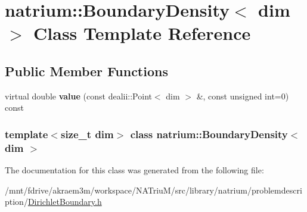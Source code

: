 \hypertarget{classnatrium_1_1BoundaryDensity}{
\section{natrium::BoundaryDensity$<$ dim $>$ Class Template Reference}
\label{classnatrium_1_1BoundaryDensity}
}
\subsection*{Public Member Functions}
\begin{DoxyCompactItemize}
\item 
\hypertarget{classnatrium_1_1BoundaryDensity_af8fcef848578f2e75d6aad467b38244f}{
virtual double {\bfseries value} (const dealii::Point$<$ dim $>$ \&, const unsigned int=0) const }
\label{classnatrium_1_1BoundaryDensity_af8fcef848578f2e75d6aad467b38244f}

\end{DoxyCompactItemize}
\subsubsection*{template$<$size\_\-t dim$>$ class natrium::BoundaryDensity$<$ dim $>$}



The documentation for this class was generated from the following file:\begin{DoxyCompactItemize}
\item 
/mnt/fdrive/akraem3m/workspace/NATriuM/src/library/natrium/problemdescription/\hyperlink{DirichletBoundary_8h}{DirichletBoundary.h}\end{DoxyCompactItemize}
